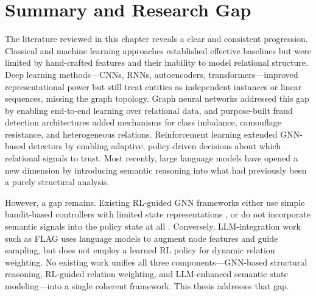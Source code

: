 \section{Summary and Research Gap}

The literature reviewed in this chapter reveals a clear and consistent progression.
Classical and machine learning approaches established effective baselines but were
limited by hand-crafted features and their inability to model relational structure.
Deep learning methods—CNNs, RNNs, autoencoders, transformers—improved representational
power but still treat entities as independent instances or linear sequences, missing
the graph topology. Graph neural networks addressed this gap by enabling end-to-end
learning over relational data, and purpose-built fraud detection architectures added
mechanisms for class imbalance, camouflage resistance, and heterogeneous relations.
Reinforcement learning extended GNN-based detectors by enabling adaptive, policy-driven
decisions about which relational signals to trust. Most recently, large language models
have opened a new dimension by introducing semantic reasoning into what had previously
been a purely structural analysis.

However, a gap remains. Existing RL-guided GNN frameworks either use simple bandit-based
controllers with limited state representations \cite{dou2020enhancing}, or do not
incorporate semantic signals into the policy state at all \cite{peng2022reinforced}.
Conversely, LLM-integration work such as FLAG uses language models to augment node
features and guide sampling, but does not employ a learned RL policy for dynamic
relation weighting. No existing work unifies all three components—GNN-based structural
reasoning, RL-guided relation weighting, and LLM-enhanced semantic state modeling—into
a single coherent framework. This thesis addresses that gap.

\clearpage